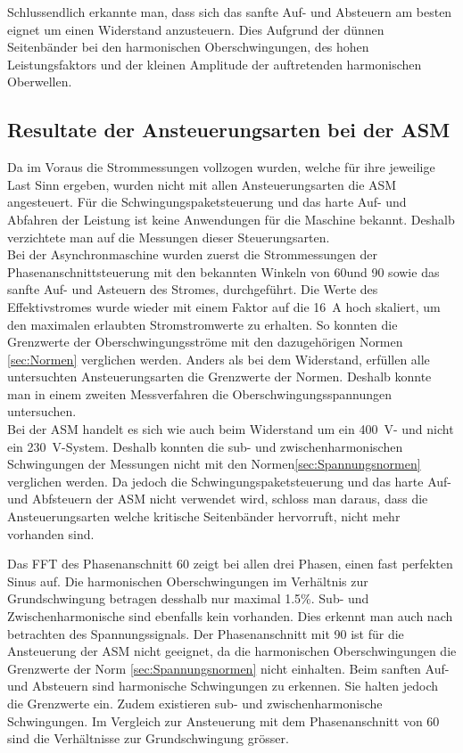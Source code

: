 Schlussendlich erkannte man, dass sich das sanfte Auf- und Absteuern am besten eignet um einen Widerstand anzusteuern. Dies Aufgrund der dünnen Seitenbänder bei den harmonischen Oberschwingungen, des hohen Leistungsfaktors und der kleinen Amplitude der auftretenden harmonischen Oberwellen.

\subsection{Resultate der Ansteuerungsarten bei der ASM}
Da im Voraus die Strommessungen vollzogen wurden, welche für ihre jeweilige Last Sinn ergeben, wurden nicht mit allen Ansteuerungsarten die ASM angesteuert. Für die Schwingungspaketsteuerung und das harte Auf- und Abfahren der Leistung ist keine Anwendungen für die Maschine bekannt. Deshalb verzichtete man auf die Messungen dieser Steuerungsarten.\\


Bei der Asynchronmaschine wurden zuerst die Strommessungen der Phasenanschnittsteuerung mit den bekannten Winkeln von 60\textdegree und 90\textdegree \hspace{0.02cm} sowie das sanfte Auf- und Asteuern des Stromes, durchgeführt. Die Werte des Effektivstromes wurde wieder mit einem Faktor auf die \SI{16}{A} hoch skaliert, um den maximalen erlaubten Stromstromwerte zu erhalten. So konnten die Grenzwerte der Oberschwingungsströme mit den dazugehörigen Normen \ref{sec:Normen} verglichen werden. Anders als bei dem Widerstand, erfüllen alle untersuchten Ansteuerungsarten die Grenzwerte der Normen. Deshalb konnte man in einem zweiten Messverfahren die Oberschwingungsspannungen untersuchen.\\

Bei der ASM handelt es sich wie auch beim Widerstand um ein \SI{400}{V}- und nicht ein \SI{230}{V}-System. Deshalb konnten die sub- und zwischenharmonischen Schwingungen der Messungen nicht mit den Normen\ref{sec:Spannungsnormen} verglichen werden.
Da jedoch die Schwingungspaketsteuerung und das harte Auf- und Abfsteuern der ASM nicht verwendet wird, schloss man daraus, dass die Ansteuerungsarten welche kritische Seitenbänder hervorruft, nicht mehr vorhanden sind. 

Das FFT des Phasenanschnitt 60\textdegree \hspace{0.02cm} zeigt bei allen drei Phasen, einen fast perfekten Sinus auf.
Die harmonischen Oberschwingungen im Verhältnis zur Grundschwingung betragen desshalb nur maximal 1.5\%. Sub- und Zwischenharmonische sind ebenfalls kein vorhanden. Dies erkennt man auch nach betrachten des Spannungssignals.
Der Phasenanschnitt mit 90\textdegree \hspace{0.02cm} ist für die Ansteuerung der ASM nicht geeignet, da die harmonischen Oberschwingungen die Grenzwerte der Norm \ref{sec:Spannungsnormen} nicht einhalten. 
Beim sanften Auf- und Absteuern sind harmonische Schwingungen zu erkennen. Sie halten jedoch die Grenzwerte ein. Zudem existieren sub- und zwischenharmonische Schwingungen. Im Vergleich zur Ansteuerung mit dem Phasenanschnitt von 60\textdegree \hspace{0.02cm} sind die Verhältnisse zur Grundschwingung grösser.\\ 

